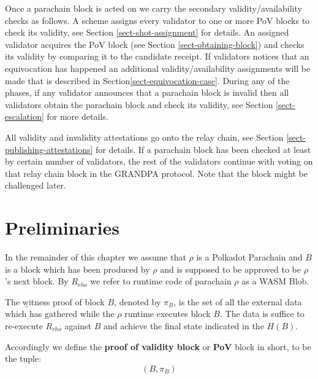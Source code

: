 Once a parachain block is acted on we carry the secondary validity/availability checks as follows. A scheme assigns every validator to one or more PoV blocks to check its validity, see Section \ref{sect-shot-assignment} for details. An assigned validator acquires the PoV block (see Section \ref{sect-obtaining-block}) and checks its validity by comparing it to the candidate receipt. If validators notices that an equivocation has happened an additional validity/availability assignments will be made that is described in Section\ref{sect-equivocation-case}. 
During any of the phases, if any validator announces that a parachain block is invalid then all validators obtain the parachain block and check its validity, see Section \ref{sect-escalation} for more details. 

All validity and invalidity attestations go onto the relay chain, see Section \ref{sect-publishing-attestations} for details. If a parachain block has been checked at least by certain number of validators, the rest of the validators continue with voting on that relay chain block in the GRANDPA protocol. Note that the block might be challenged later. 
	 
\section{Preliminaries}

\begin{definition}
In the remainder of this chapter we assume that $\rho$ is a Polkadot Parachain and $B$ is a block which has been produced by $\rho$ and is supposed to be approved to be $\rho$'s next block. By $R_{rho}$ we refer to runtime code of parachain $\rho$  as a WASM Blob. 
\end{definition}

\begin{definition}
  \label{defn-witness-proof}
  The {\b witness proof} of block $B$, denoted by {\bf $\pi_B$}, is the set of all the external data which has gathered while the $\rho$ runtime executes block $B$. The data is suffice to re-execute $R_{rho}$ against $B$ and achieve the final state indicated in the $H(B)$.
\end{definition}

\begin{definition}
  \label{defn-pov-block}
  Accordingly we define the {\bf proof of validity block} or {\bf PoV} block in short, %
  to be the tuple:
  \[
  (B, \pi_B)
  \]
\end{definition}

